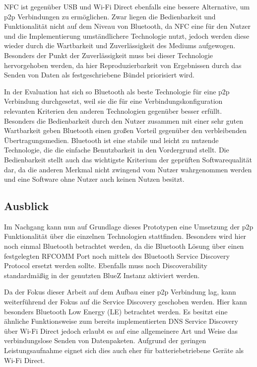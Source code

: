 NFC ist gegenüber USB und Wi-Fi Direct ebenfalls eine bessere Alternative, um p2p Verbindungen zu ermöglichen. Zwar liegen die Bedienbarkeit und Funktionalität nicht auf dem Niveau von Bluetooth, da NFC eine für den Nutzer und die Implementierung umständlichere Technologie nutzt, jedoch werden diese wieder durch die Wartbarkeit und Zuverlässigkeit des Mediums aufgewogen. Besonders der Punkt der Zuverlässigkeit muss bei dieser Technologie hervorgehoben werden, da hier Reproduzierbarkeit von Ergebnissen durch das Senden von Daten als festgeschriebene Bündel priorisiert wird.

In der Evaluation hat sich so Bluetooth als beste Technologie für eine p2p Verbindung durchgesetzt, weil sie die für eine Verbindungskonfiguration relevanten Kriterien den anderen Technologien gegenüber besser erfüllt. Besonders die Bedienbarkeit durch den Nutzer zusammen mit einer sehr guten Wartbarkeit geben Bluetooth einen großen Vorteil gegenüber den verbleibenden Übertragungsmedien. Bluetooth ist eine stabile und leicht zu nutzende Technologie, die die einfache Benutzbarkeit in den Vordergrund stellt. Die Bedienbarkeit stellt auch das wichtigste Kriterium  der geprüften Softwarequalität dar, da die anderen Merkmal nicht zwingend vom Nutzer wahrgenommen werden und eine Software ohne Nutzer auch keinen Nutzen besitzt.

\subsection{Ausblick}

Im Nachgang kann nun auf Grundlage dieses Prototypen eine Umsetzung der p2p Funktionalität über die einzelnen Technologien stattfinden. Besonders wird hier noch einmal Bluetooth betrachtet werden, da die Bluetooth Lösung über einen festgelegten RFCOMM Port noch mittels des Bluetooth Service Discovery Protocol ersetzt werden sollte. Ebenfalls muss noch Discoverability standardmäßig in der genutzten BlueZ Instanz aktiviert werden.

Da der Fokus dieser Arbeit auf dem Aufbau einer p2p Verbindung lag, kann weiterführend der Fokus auf die Service Discovery geschoben werden. Hier kann besonders Bluetooth Low Energy (LE) betrachtet werden. Es besitzt eine ähnliche Funktionsweise zum bereits implementierten DNS Service Discovery über Wi-Fi Direct jedoch erlaubt es auf eine allgemeinere Art und Weise das verbindungslose Senden von Datenpaketen. Aufgrund der geringen Leistungsaufnahme eignet sich dies auch eher für batteriebetriebene Geräte als Wi-Fi Direct.

